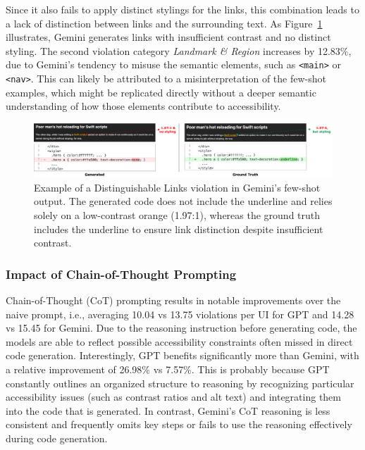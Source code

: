 Since it also fails to apply distinct stylings for the links, this
combination leads to 
a lack of distinction between links and the surrounding text.
As Figure~\ref{fig:distinguishablecolorlinks} illustrates, 
Gemini generates links with insufficient contrast and no distinct styling.
\newline
The second violation category 
\emph{Landmark \& Region} increases by 12.83\%, due to 
Gemini's tendency to misuse the semantic 
elements, such as \texttt{<main>} or \texttt{<nav>}. This 
can likely be attributed to a misinterpretation of 
the few-shot examples, which might be replicated 
directly without a deeper semantic understanding of 
how those elements contribute to accessibility.

\begin{figure}
  \centering
  \includegraphics[width=1\linewidth]{figures/distinguishablecolorlinks.png}
  \caption{Example of a Distinguishable Links violation in Gemini’s few-shot output. The generated code does not include the underline and relies solely on a low-contrast orange (1.97:1), whereas the ground truth includes the underline to ensure link distinction despite insufficient contrast.}
  \label{fig:distinguishablecolorlinks} 
\end{figure}

\subsubsection{Impact of Chain-of-Thought Prompting}
Chain-of-Thought (CoT) prompting results in notable improvements 
over the naive prompt, i.e., averaging 10.04 vs 13.75 violations
per UI for GPT and 14.28 vs 15.45 for Gemini. Due to 
the reasoning instruction before generating code, 
the models are able to reflect possible accessibility 
constraints often missed in direct code generation.
Interestingly, GPT benefits significantly more 
than Gemini, with a relative improvement of 26.98\% vs 
7.57\%. This is probably because GPT constantly 
outlines an organized structure to reasoning by 
recognizing particular accessibility issues 
(such as contrast ratios and alt text) and integrating them into 
the code that is generated. In contrast, Gemini's 
CoT reasoning is less consistent and frequently omits 
key steps or fails to use the reasoning effectively 
during code generation.

